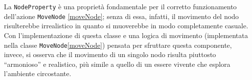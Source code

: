 La \texttt{NodeProperty} è una proprietà fondamentale per il corretto funzionamento dell'azione \texttt{MoveNode}
\space\ref{moveNode}; senza di essa, infatti, il movimento del nodo risulterebbe irrealistico in quanto si muoverebbe in modo completamente casuale.
Con l'implementazione di questa classe e una logica di movimento (implementata nella classe \texttt{MoveNode}\space\ref{moveNode})
pensata per sfruttare questa componente, invece,
si osserva che il movimento di un singolo nodo risulta piuttosto ``armonioso'' e realistico, più simile a quello di un essere vivente che 
esplora l'ambiente circostante.

